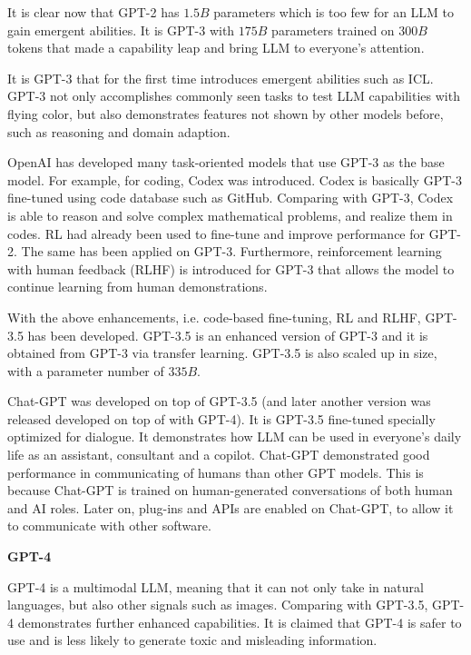 It is clear now that GPT-2 has $1.5B$ parameters which is too few for an LLM to gain emergent abilities. It is GPT-3 with $175B$ parameters trained on $300B$ tokens that made a capability leap and bring LLM to everyone's attention.

It is GPT-3 that for the first time introduces emergent abilities such as ICL. GPT-3 not only accomplishes commonly seen tasks to test LLM capabilities with flying color, but also demonstrates features not shown by other models before, such as reasoning and domain adaption.

OpenAI has developed many task-oriented models that use GPT-3 as the base model. For example, for coding, Codex was introduced. Codex is basically GPT-3 fine-tuned using code database such as GitHub. Comparing with GPT-3, Codex is able to reason and solve complex mathematical problems, and realize them in codes. RL had already been used to fine-tune and improve performance for GPT-2. The same has been applied on GPT-3. Furthermore, reinforcement learning with human feedback (RLHF) is introduced for GPT-3 that allows the model to continue learning from human demonstrations.

With the above enhancements, i.e. code-based fine-tuning, RL and RLHF, GPT-3.5 has been developed. GPT-3.5 is an enhanced version of GPT-3 and it is obtained from GPT-3 via transfer learning. GPT-3.5 is also scaled up in size, with a parameter number of $335B$.

Chat-GPT was developed on top of GPT-3.5 (and later another version was released developed on top of with GPT-4). It is GPT-3.5 fine-tuned specially optimized for dialogue. It demonstrates how LLM can be used in everyone's daily life as an assistant, consultant and a copilot. Chat-GPT demonstrated good performance in communicating of humans than other GPT models. This is because Chat-GPT is trained on human-generated conversations of both human and AI roles. Later on, plug-ins and APIs are enabled on Chat-GPT, to allow it to communicate with other software.

\vspace{0.1in}
\noindent \textbf{GPT-4}
\vspace{0.1in}

GPT-4 is a multimodal LLM, meaning that it can not only take in natural languages, but also other signals such as images. Comparing with GPT-3.5, GPT-4 demonstrates further enhanced capabilities. It is claimed that GPT-4 is safer to use and is less likely to generate toxic and misleading information.

